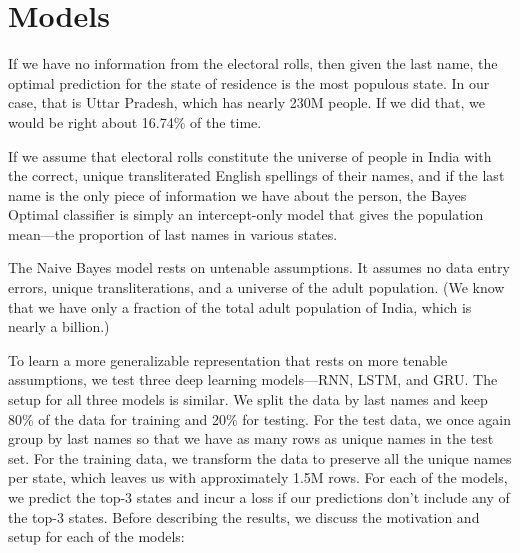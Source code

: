 \documentclass[11pt,  letterpaper]{article}
\begin{document}
\section{Models}

If we have no information from the electoral rolls, then given the last name, the optimal prediction for the state of residence is the most populous state. In our case, that is Uttar Pradesh, which has nearly 230M people. If we did that, we would be right about 16.74\% of the time.

If we assume that electoral rolls constitute the universe of people in India with the correct, unique transliterated English spellings of their names, and if the last name is the only piece of information we have about the person, the Bayes Optimal classifier is simply an intercept-only model that gives the population mean---the proportion of last names in various states.

The Naive Bayes model rests on untenable assumptions. It assumes no data entry errors, unique transliterations, and a universe of the adult population. (We know that we have only a fraction of the total adult population of India, which is nearly a billion.)


To learn a more generalizable representation that rests on more tenable assumptions, we test three deep learning models---RNN, LSTM, and GRU. The setup for all three models is similar. We split the data by last names and keep 80\% of the data for training and 20\% for testing. For the test data, we once again group by last names so that we have as many rows as unique names in the test set. For the training data, we transform the data to preserve all the unique names per state, which leaves us with approximately 1.5M rows. For each of the models, we predict the top-3 states and incur a loss if our predictions don't include any of the top-3 states. Before describing the results, we discuss the motivation and setup for each of the models:
\end{document}
